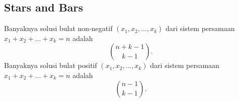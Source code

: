 \subsection{Stars and Bars}
Banyaknya solusi bulat non-negatif $(x_1,x_2,\dots,x_k)$ dari sistem persamaan $x_1+x_2+\dots+x_k=n$ adalah
$${n+k-1 \choose k-1}.$$
Banyaknya solusi bulat positif $(x_1,x_2,\dots,x_k)$ dari sistem persamaan $x_1+x_2+\dots+x_k=n$ adalah
$${n-1 \choose k-1}.$$